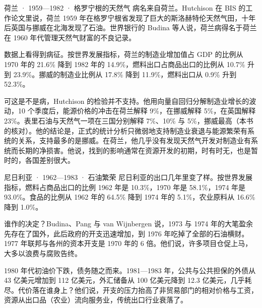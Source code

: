 \begin{case}{荷兰 · 1959—1982 · 格罗宁根的天然气}
病名来自荷兰。Hutchison 在 BIS 的工作论文里说，荷兰 1959 年在格罗宁根省发现了巨大的斯洛赫特伦天然气田，十年后英国与挪威在北海发现了石油\cite{hutchison1990}。世界银行的 Budina 等人说，荷兰病得名于荷兰在 1960 年代管理天然气财富的不良记录\cite{budina2007}。

数据上看得到病征。按世界发展指标，荷兰的制造业增加值占 GDP 的比例从 1970 年的 21.6\% 降到 1982 年的 14.9\%，燃料出口占商品出口的比例从 10.7\% 升到 23.9\%\cite{wdi47}。挪威的制造业比例从 17.8\% 降到 11.9\%，燃料出口从 0.9\% 升到 52.3\%\cite{wdi47}。

可这是不是病，Hutchison 的检验并不支持。他用向量自回归分解制造业增长的波动，10 个季度后，能源价格的冲击在荷兰解释 9\%，在挪威解释 5\%，在英国解释 23\%\cite{hutchison1990}。表里石油与天然气一项在三国分别解释 7\%、10\% 与 5\%，挪威最高（本书的核对）\cite{hutchison1990}。他的结论是，正式的统计分析只微弱地支持制造业衰退与能源繁荣有系统的关系，支持最多的是挪威\cite{hutchison1990}。在荷兰，他几乎没有发现天然气开发对制造业有系统而长期的净损害\cite{hutchison1990}。他说，找到的影响通常在资源开发的初期，时有时无，也是暂时的，各国差别很大\cite{hutchison1990}。
\end{case}

\begin{case}{尼日利亚 · 1962—1983 · 石油繁荣}
尼日利亚的出口几年里变了样。按世界发展指标，燃料占商品出口的比例 1962 年是 10.3\%，1970 年是 58.1\%，1974 年是 93.0\%\cite{wdi47}。食品的比例从 1962 年的 64.5\% 降到 1974 年的 5.1\%，农业原料从 16.6\% 降到 1.0\%\cite{wdi47}。

谁作的决定？Budina、Pang 与 van Wijnbergen 说，1973 与 1974 年的大笔盈余先存在了国外，此后政府的开支迅速增加，到 1976 年吃掉了全部的石油横财\cite{budina2007}。1977 年联邦与各州的资本开支是 1970 年的 6 倍\cite{budina2007}。他们说，许多项目仓促上马，大多以浪费与腐败告终\cite{budina2007}。

1980 年代初油价下跌，债务随之而来。1981—1983 年，公共与公共担保的外债从 43 亿美元增加到 112 亿美元，外汇储备从 100 亿美元降到 12.3 亿美元，几乎耗尽\cite{budina2007}。代价落在谁身上？他们说，开支的压力抬高了非贸易部门的相对价格与工资，资源从出口品（农业）流向服务业，传统出口行业衰落了\cite{budina2007}。
\end{case}

